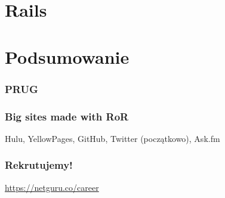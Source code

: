 \documentclass{beamer}
\begin{document}
\section{Rails}


\section{Podsumowanie}

\begin{frame}[fragile]
\frametitle{PRUG}
\end{frame}

\begin{frame}[fragile]
\frametitle{Big sites made with RoR}
Hulu, YellowPages, GitHub, Twitter (początkowo), Ask.fm
\end{frame}

\begin{frame}[fragile]
\frametitle{Rekrutujemy!}
\url{https://netguru.co/career}
\end{frame}
\end{document}
